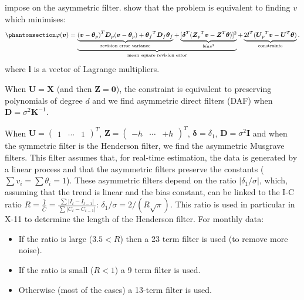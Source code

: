 \documentclass[
]{article}
\newcommand\transp[1]{{#1}^T}
\newcommand\1{\mathds{1}}
\begin{document}
impose on the asymmetric filter. \textcite{proietti2008} show that the
problem is equivalent to finding \(v\) which minimises:
\begin{equation}\phantomsection\label{eq-lppasym}{
\varphi(\boldsymbol v)=
\underbrace{
  \underbrace{\transp{(\boldsymbol v-\boldsymbol \theta_{p})}\boldsymbol D_{p}(\boldsymbol v-\boldsymbol \theta_{p})+
  \transp{\boldsymbol \theta_{f}}\boldsymbol D_{f}\boldsymbol \theta_{f}}_\text{revision error variance}+
  \underbrace{[\transp{\boldsymbol \delta}(\transp{\boldsymbol Z_{p}}\boldsymbol v-\transp{\boldsymbol Z}\boldsymbol \theta)]^{2}}_{bias^2}
}_\text{mean square revision error}+
\underbrace{2\transp{\boldsymbol l}(\transp{\boldsymbol U_{p}}\boldsymbol v-\transp{\boldsymbol U}\boldsymbol \theta)}_{\text{constraints}}.
}\end{equation} where \(\boldsymbol l\) is a vector of Lagrange
multipliers.

When \(\boldsymbol U=\boldsymbol X\) (and then
\(\boldsymbol Z = \boldsymbol 0\)), the constraint is equivalent to
preserving polynomials of degree \(d\) and we find asymmetric direct
filters (DAF) when \(\boldsymbol D=\sigma^2\boldsymbol K^{-1}\).

When \(\boldsymbol U=\transp{\begin{pmatrix}1&\cdots&1\end{pmatrix}}\),
\(\boldsymbol Z=\transp{\begin{pmatrix}-h&\cdots&+h\end{pmatrix}}\),
\(\boldsymbol \delta=\delta_1\), \(\boldsymbol D=\sigma^2\boldsymbol I\)
and when the symmetric filter is the Henderson filter, we find the
asymmetric Musgrave filters. This filter assumes that, for real-time
estimation, the data is generated by a linear process and that the
asymmetric filters preserve the constants
(\(\sum v_i=\sum \theta_i=1\)). These asymmetric filters depend on the
ratio \(\lvert\delta_1/\sigma\rvert\), which, assuming that the trend is
linear and the bias constant, can be linked to the I-C ratio
\(R=\frac{\bar{I}}{\bar{C}}=\frac{\sum\lvert I_t-I_{t-1}\rvert}{\sum\lvert C_t-C_{t-1}\rvert}\):
\(\delta_1/\sigma=2/(R\sqrt{\pi})\). This ratio is used in particular in
X-11 to determine the length of the Henderson filter. For monthly data:

\begin{itemize}
\item
  If the ratio is large (\(3.5< R\)) then a 23 term filter is used (to
  remove more noise).
\item
  If the ratio is small (\(R<1\)) a 9 term filter is used.
\item
  Otherwise (most of the cases) a 13-term filter is used.
\end{itemize}
\end{document}
